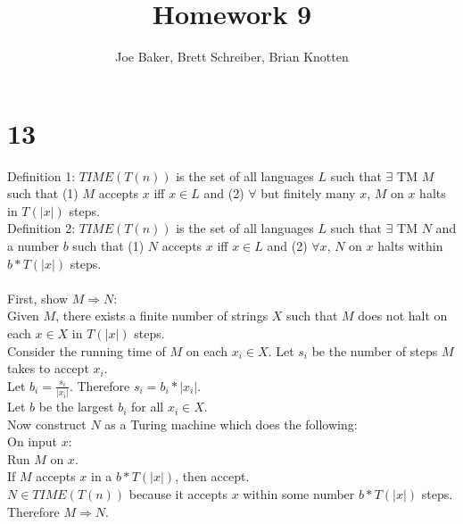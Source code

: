\documentclass[letterpaper,notitlepage,twoside]{article}
\renewcommand{\implies}{\Rightarrow} %
\newcommand\tab[1][1cm]{\hspace*{#1}} %
\begin{document}
\title{Homework 9}
\author{Joe Baker, Brett Schreiber, Brian Knotten}
\maketitle

\section*{13}
Definition 1:  $TIME(T(n))$ is the set of all languages $L$ such that $\exists$ TM $M$ such that (1) $M$ accepts $x$ iff $x \in L$ and (2) $\forall$ but finitely many $x$, $M$ on $x$ halts in $T(|x|)$ steps. \\
Definition 2: $TIME(T(n))$ is the set of all languages $L$ such that $\exists$ TM $N$ and a number $b$ such that (1) $N$ accepts $x$ iff $x \in L$ and (2) $\forall x$, $N$ on $x$ halts within $b * T(|x|)$ steps. \\ \\
First, show $M \implies N$: \\
Given $M$, there exists a finite number of strings $X$ such that $M$ does not halt on each $x \in X$ in $T(|x|)$ steps. \\
Consider the running time of $M$ on each $x_i \in X$. Let $s_i$ be the number of steps $M$ takes to accept $x_i$.\\
Let $b_i = \frac{s_i}{|x_i|}$. Therefore $s_i = b_i * |x_i|$.\\
Let $b$ be the largest $b_i$ for all $x_i \in X$.\\
Now construct $N$ as a Turing machine which does the following: \\
On input $x$: \\
	\tab Run $M$ on $x$. \\
	\tab If $M$ accepts $x$ in a $b * T(|x|)$, then accept. \\
$N \in TIME(T(n))$ because it accepts $x$ within some number $b * T(|x|)$ steps. Therefore $M \implies N$.
\end{document}

